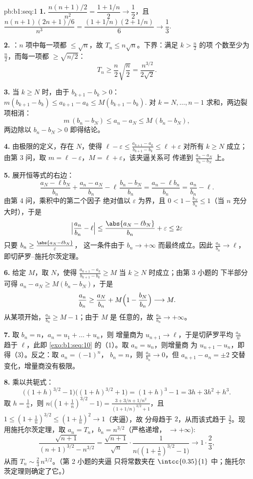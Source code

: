 \begin{solution}{pb:b1:seq:1}
\textbf{1.} $\dfrac{n(n+1)/2}{n^2} = \dfrac{1 + 1/n}{2} \to
\dfrac12$，且 $\dfrac{n(n+1)(2n+1)/6}{n^3} = \dfrac{(1 +
1/n)(2 + 1/n)}{6} \to \dfrac13$.

\textbf{2.} ：$n$ 项中每一项都 $\leq \sqrt n$，故
$T_n \leq n\sqrt n$。下界：满足 $k > \frac n2$ 的项
个数至少为 $\frac n2$，而每一项都 $\geq \sqrt{n/2}$：
\[
T_n \geq \frac n2 \sqrt{\frac n2} = \frac{n^{3/2}}{2\sqrt 2} .
\]

\textbf{3.} 当 $k \geq N$ 时，由于 $b_{k+1} - b_k > 0$：
$m(b_{k+1} - b_k) \leq a_{k+1} - a_k \leq M(b_{k+1} - b_k)$.
对 $k = N, \dots, n - 1$ 求和，两边裂项相消：
\[
m\,(b_n - b_N) \leq a_n - a_N \leq M\,(b_n - b_N),
\]
两边除以 $b_n - b_N > 0$ 即得结论。

\textbf{4.} 由极限的定义，存在 $N$，使得 $\ell -
\varepsilon \leq \frac{a_{k+1} - a_k}{b_{k+1} - b_k} \leq \ell +
\varepsilon$ 对所有 $k \geq N$ 成立；由第 3 问，取 $m = \ell -
\varepsilon$，$M = \ell + \varepsilon$，该夹逼关系可
传递到 $\frac{a_n - a_N}{b_n - b_N}$ 上。

\textbf{5.} 展开恒等式的右边：
\[
\frac{a_N - \ell b_N}{b_n} + \frac{a_n - a_N}{b_n} -
\ell\,\frac{b_n - b_N}{b_n}
= \frac{a_n - \ell b_n}{b_n} = \frac{a_n}{b_n} - \ell .
\]
由第 4 问，乘积中的第二个因子
绝对值以 $\varepsilon$ 为界，且 $0 < 1 - \frac{b_N}{b_n}
\leq 1$（当 $n$ 充分大时），于是
\[
\Bigl|\frac{a_n}{b_n} - \ell\Bigr|
\leq \frac{\abs{a_N - \ell b_N}}{b_n} + \varepsilon
\leq 2\varepsilon
\]
只要 $b_n \geq \frac{\abs{a_N - \ell b_N}}{\varepsilon}$，
这一条件由于 $b_n \to +\infty$ 而最终成立。因此
$\frac{a_n}{b_n} \to \ell$，即切萨罗--施托尔茨定理。

\textbf{6.} 给定 $M$，取 $N$，使得 $\frac{a_{k+1} -
a_k}{b_{k+1} - b_k} \geq M$ 当 $k \geq N$ 时成立；由第 3 小题的
下半部分可得 $a_n - a_N \geq M(b_n - b_N)$，于是
\[
\frac{a_n}{b_n} \geq \frac{a_N}{b_n} +
M\Bigl(1 - \frac{b_N}{b_n}\Bigr) \longrightarrow M .
\]
从某项开始，$\frac{a_n}{b_n} \geq M - 1$；由于 $M$ 是
任意的，故 $\frac{a_n}{b_n} \to +\infty$。

\textbf{7.} 取 $b_n = n$，$a_n = u_1 + \dots + u_n$，则
增量商为 $u_{n+1} \to \ell$，于是切萨罗平均
$\frac{a_n}{n}$ 趋于 $\ell$，此即
\cref{exo:b1:seq:10} 的（1）。取 $a_n = u_n$，则增量商
为 $u_{n+1} - u_n$，即得（3）。反之：取 $a_n = (-1)^n$，
$b_n = n$，则 $\frac{a_n}{b_n} \to 0$，但 $a_{n+1} - a_n = \pm
2$ 交替变化，增量商没有极限。

\textbf{8.} 乘以共轭式：
\[
\bigl((1+h)^{3/2} - 1\bigr)\bigl((1+h)^{3/2} + 1\bigr)
= (1+h)^3 - 1 = 3h + 3h^2 + h^3 .
\]
取 $h = \frac1n$，则 $n\bigl((1 + \frac1n)^{3/2} - 1\bigr) =
\frac{3 + 3/n + 1/n^2}{(1 + 1/n)^{3/2} + 1}$，且 $1 \leq (1 +
\frac1n)^{3/2} \leq (1 + \frac1n)^2 \to 1$（夹逼），故
分母趋于 $2$，从而该式趋于 $\frac32$。现
用施托尔茨定理，取 $a_n = T_n$，$b_n = n^{3/2}$（严格递增，
$\to +\infty$):
\[
\frac{\sqrt{n+1}}{(n+1)^{3/2} - n^{3/2}}
= \frac{\sqrt{n+1}}{\sqrt n} \cdot
\frac{1}{n\bigl((1 + \frac1n)^{3/2} - 1\bigr)}
\longrightarrow 1 \cdot \frac{2}{3},
\]
从而 $T_n \sim \frac23\,n^{3/2}$。（第 2 小题的夹逼
只将常数夹在 $\intcc{0.35}{1}$ 中；施托尔茨定理则确定了它。）


\end{solution}
